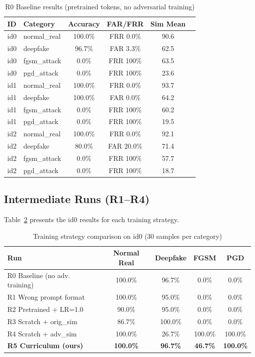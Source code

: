 \documentclass[12pt,a4paper]{article}
\begin{document}
\begin{table}[H]
\centering
\caption{R0 Baseline results (pretrained tokens, no adversarial training)}
\label{tab:r0}
\begin{tabular}{@{}llcccc@{}}
\toprule
\textbf{ID} & \textbf{Category} & \textbf{Accuracy} & \textbf{FAR/FRR} & \textbf{Sim Mean} \\
\midrule
id0 & normal\_real  & 100.0\% & FRR 0.0\%  & 90.6 \\
id0 & deepfake      &  96.7\% & FAR 3.3\%  & 62.5 \\
id0 & fgsm\_attack  &   0.0\% & FRR 100\%  & 63.5 \\
id0 & pgd\_attack   &   0.0\% & FRR 100\%  & 23.6 \\
\midrule
id1 & normal\_real  & 100.0\% & FRR 0.0\%  & 93.7 \\
id1 & deepfake      & 100.0\% & FAR 0.0\%  & 64.2 \\
id1 & fgsm\_attack  &   0.0\% & FRR 100\%  & 60.2 \\
id1 & pgd\_attack   &   0.0\% & FRR 100\%  & 19.5 \\
\midrule
id2 & normal\_real  & 100.0\% & FRR 0.0\%  & 92.1 \\
id2 & deepfake      &  80.0\% & FAR 20.0\% & 71.4 \\
id2 & fgsm\_attack  &   0.0\% & FRR 100\%  & 57.7 \\
id2 & pgd\_attack   &   0.0\% & FRR 100\%  & 18.7 \\
\bottomrule
\end{tabular}
\end{table}

\subsection{Intermediate Runs (R1--R4)}

Table~\ref{tab:rall} presents the id0 results for each training strategy.

\begin{table}[H]
\centering
\caption{Training strategy comparison on id0 (30 samples per category)}
\label{tab:rall}
\begin{tabular}{@{}lcccc@{}}
\toprule
\textbf{Run} & \textbf{Normal Real} & \textbf{Deepfake} & \textbf{FGSM} & \textbf{PGD} \\
\midrule
R0 Baseline (no adv. training)     & 100.0\% & 96.7\%  &  0.0\% &  0.0\% \\
R1 Wrong prompt format              & 100.0\% & 95.0\%  &  0.0\% &  0.0\% \\
R2 Pretrained + LR=1.0              &  90.0\% & 95.0\%  &  0.0\% &  0.0\% \\
R3 Scratch + orig\_sim              &  86.7\% & 100.0\% &  0.0\% &  0.0\% \\
R4 Scratch + adv\_sim               & 100.0\% & 26.7\%  & 100.0\% & 100.0\% \\
\textbf{R5 Curriculum (ours)}       & \textbf{100.0\%} & \textbf{96.7\%} & \textbf{46.7\%} & \textbf{100.0\%} \\
\bottomrule
\end{tabular}
\end{table}
\end{document}
